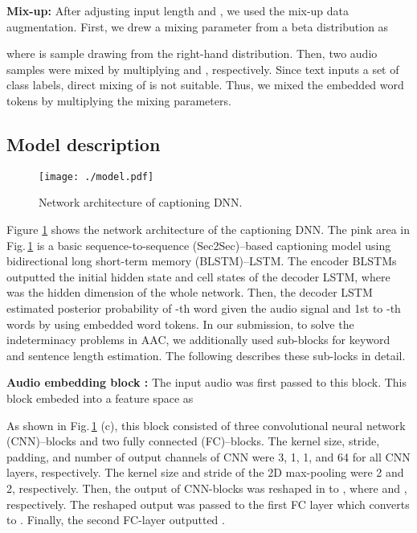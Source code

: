\documentclass{article}
\begin{document}
\begin{sloppy}
\vspace{3pt}
\noindent
{\bf Mix-up:} 
After adjusting input length  and , we used the mix-up data augmentation.
First, we drew a mixing parameter  from a beta distribution as

where  is sample drawing from the right-hand distribution.
Then, two audio samples were mixed by multiplying  and , respectively.
Since text inputs a set of class labels, direct mixing of  is not suitable. Thus, we mixed the embedded word tokens by multiplying the mixing parameters.



\subsection{Model description}

\begin{figure}[t]
  \centering
\texttt{[image: ./model.pdf]} 
  \vspace{-15pt}
  \caption{Network architecture of captioning DNN.}
  \label{fig:modelov}
  \vspace{-10pt}
\end{figure}

Figure \ref{fig:modelov} shows the network architecture of the captioning DNN.
The pink area in Fig.\,\ref{fig:modelov} is a basic sequence-to-sequence (Sec2Sec)--based captioning model \cite{seq2seq1} using bidirectional long short-term memory (BLSTM)--LSTM. 
The encoder BLSTMs outputted the initial hidden state  and cell states  of the decoder LSTM, where  was the hidden dimension of the whole network.
Then, the decoder LSTM estimated posterior probability of -th word given the audio signal  and 1st to -th words  by using embedded word tokens.
In our submission, to solve the indeterminacy problems in AAC, we additionally used sub-blocks for keyword and sentence length estimation.
The following describes these sub-locks in detail.


\vspace{3pt}
\noindent
{\bf Audio embedding block :} The input audio  was first passed to this block.
This block embeded  into a feature space as

As shown in Fig.\,\ref{fig:modelov} (c), this block consisted of three convolutional neural network (CNN)--blocks and two fully connected (FC)--blocks.
The kernel size, stride, padding, and number of output channels of CNN were 3, 1, 1, and 64 for all CNN layers, respectively.
The kernel size and stride of the 2D max-pooling were 2 and 2, respectively.
Then, the output of CNN-blocks  was reshaped in to 
, where  and , respectively.
The reshaped output was passed to the first FC layer which converts  to .
Finally, the second FC-layer outputted .



\end{sloppy}
\end{document}
